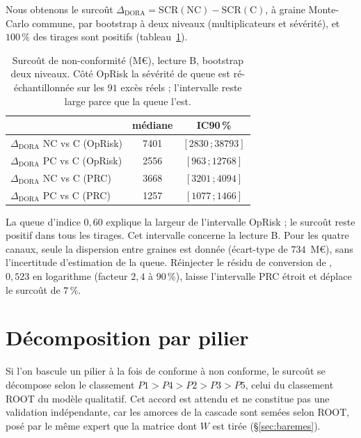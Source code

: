 Nous obtenons le surcoût $\Delta_{\text{DORA}}=\mathrm{SCR}(\text{NC})-\mathrm{SCR}(\text{C})$, à
graine Monte-Carlo commune, par bootstrap à deux niveaux (multiplicateurs et sévérité), et
$100\,\%$ des tirages sont positifs (tableau~\ref{tab:delta}).

\begin{table}[htbp]\centering\small
\renewcommand{\arraystretch}{1.25}
\begin{tabular}{@{}l cc@{}}
\toprule
& médiane & IC90\,\% \\
\midrule
$\Delta_{\text{DORA}}$ NC vs C (OpRisk) & 7401 & $[2830\,;38793]$ \\
$\Delta_{\text{DORA}}$ PC vs C (OpRisk) & 2556 & $[963\,;12768]$  \\
$\Delta_{\text{DORA}}$ NC vs C (PRC)    & 3668 & $[3201\,;4094]$  \\
$\Delta_{\text{DORA}}$ PC vs C (PRC)    & 1257 & $[1077\,;1466]$  \\
\bottomrule
\end{tabular}
\caption{Surcoût de non-conformité (M\euro), lecture B, bootstrap deux niveaux. Côté OpRisk la
sévérité de queue est ré-échantillonnée sur les $91$ excès réels ; l'intervalle reste large parce
que la queue l'est.}
\label{tab:delta}
\end{table}

La queue d'indice $0{,}60$ explique la largeur de l'intervalle OpRisk ; le surcoût reste positif dans tous les tirages.
Cet intervalle concerne la lecture B. Pour les quatre canaux, seule la dispersion entre graines est donnée (écart-type de $734$~M\euro), sans l'incertitude d'estimation de la queue.
Réinjecter le résidu de conversion de \citet{jacobs2014}, $0{,}523$ en logarithme (facteur $2{,}4$ à $90\,\%$),
laisse l'intervalle PRC étroit et déplace le surcoût de $7\,\%$.


\section{Décomposition par pilier}

Si l'on bascule un pilier à la fois de conforme à non conforme, le surcoût se décompose selon le
classement $P1>P4>P2>P3>P5$, celui du classement ROOT du modèle qualitatif. Cet accord est attendu et
ne constitue pas une validation indépendante, car les amorces de la cascade sont semées selon ROOT, posé par le même expert que
la matrice dont $W$ est tirée (\S\ref{sec:baremes}).

